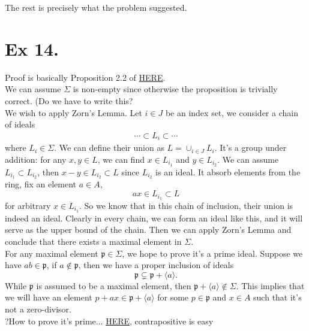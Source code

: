 The rest is precisely what the problem suggested.



\section{Ex 14.}

Proof is basically Proposition 2.2 of \href{https://www.jmilne.org/math/xnotes/CA.pdf}{HERE}.\\

We can assume $\Sigma$ is non-empty since otherwise the proposition is trivially correct.  (Do we have to write this?\\

We wish to apply Zorn's Lemma. Let $i\in J$ be an index set, we consider a chain of ideals
\begin{align*}
    \cdots\subset L_i\subset \cdots
\end{align*}where $L_i\in \Sigma$. We can define their union as $L=\cup_{i\in J} L_i$. 
It's a group under addition: for any $x,y\in L$, we can find $x\in L_{i_1}$ and $y\in L_{i_2}$. We can assume $L_{i_1}\subset L_{i_2}$, then $x-y\in L_{i_2}\subset L$ since $L_{i_2}$ is an ideal. It absorb elements from the ring, fix an element $a\in A$, 
$$ax\in L_{i_1}\subset L$$ for arbitrary $x\in L_{i_1}$. So we know that in this chain of inclusion, their union is indeed an ideal. Clearly in every chain, we can form an ideal like this, and it will serve as the upper bound of the chain. Then we can apply Zorn's Lemma and conclude that there exists a maximal element in $\Sigma$.\\

For any maximal element $\mathfrak p\in \Sigma$, we hope to prove it's a prime ideal.
Suppose we have $ab\in \mathfrak p$, if $a\notin \mathfrak p$, then we have a proper inclusion of ideals 
$$\mathfrak p\subsetneq \mathfrak p+\langle a\rangle.$$ While $\mathfrak p$ is assumed to be a maximal element, then $\mathfrak p+\langle a\rangle\notin \Sigma$. This implies that we will have an element $p+ax\in \mathfrak p+\langle a\rangle$ for some $p\in \mathfrak p$ and $x\in A$ such that it's not a zero-divisor. \\

?How to prove it's prime... \href{https://math.stackexchange.com/questions/44481/showing-the-set-of-zero-divisors-is-a-union-of-prime-ideals}{HERE}, contrapositive is easy \\

